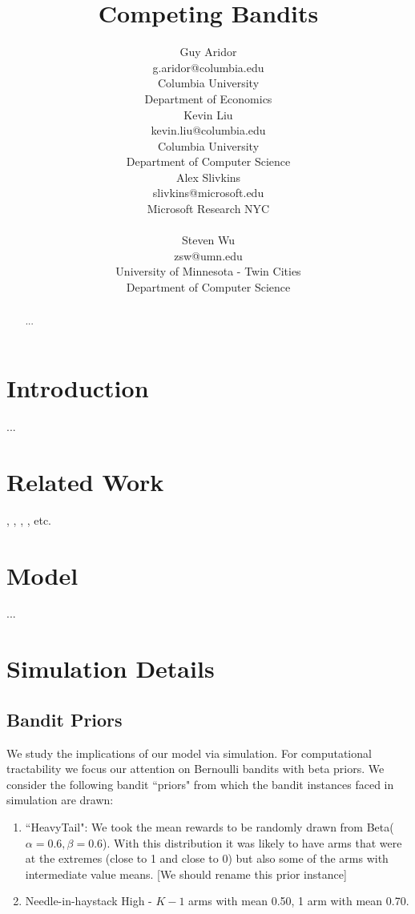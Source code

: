 \documentclass{article}
\title{Competing Bandits}
\author{Guy Aridor \\
g.aridor@columbia.edu \\
Columbia University \\ Department of Economics\\
	\And Kevin Liu\\
	kevin.liu@columbia.edu \\
	Columbia University \\Department of Computer Science\\
	\AND Alex Slivkins \\
	slivkins@microsoft.edu\\
	Microsoft Research NYC\\
	 \\ 
	\And Steven Wu\\
	zsw@umn.edu\\	
	University of Minnesota - Twin Cities \\Department of Computer Science\\	
}
\theoremstyle{definition}
\begin{document}
\maketitle

\begin{abstract}
...
\end{abstract}

\section{Introduction}
\label{S:1}

...

\section{Related Work}
\label{S:2}

\citealt*{mansour2017competing}, \citealt*{che2017recommender}, \citealt*{kremer2014implementing}, \citealt*{mansour2015bayesian}, etc.

\section{Model}
\label{S:3}

...

\section{Simulation Details}
\label{S:4}

\subsection{Bandit Priors}
We study the implications of our model via simulation. For computational tractability we focus our attention on Bernoulli bandits with beta priors. We consider the following bandit ``priors" from which the bandit instances faced in simulation are drawn:
\begin{enumerate}
\item ``HeavyTail": We took the mean rewards to be randomly drawn from Beta($\alpha=0.6,\beta=0.6$). With this distribution it was likely to have arms that were at the extremes (close to 1 and close to 0) but also some of the arms with intermediate value means. [We should rename this prior instance]
\item Needle-in-haystack High - $K-1$ arms with mean 0.50, 1 arm with mean 0.70. 
\end{enumerate}
\end{document}
